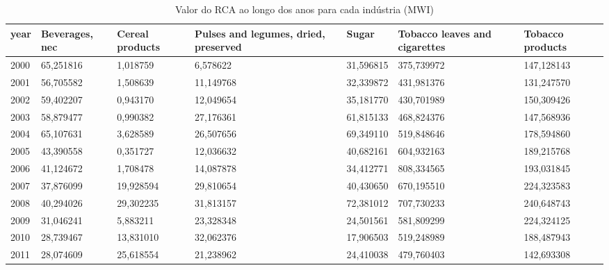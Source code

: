 \begin{table}
\centering
\caption{Valor do RCA ao longo dos anos para cada indústria (MWI)}
\begin{tabular}{p{1cm}p{2cm}p{2cm}p{2cm}p{2cm}p{2cm}p{2cm}}
\toprule
 year &  Beverages, nec &  Cereal products &  Pulses and legumes, dried, preserved &     Sugar &  Tobacco leaves and cigarettes &  Tobacco products \\
\midrule
 2000 &       65,251816 &         1,018759 &                              6,578622 & 31,596815 &                     375,739972 &        147,128143 \\
 2001 &       56,705582 &         1,508639 &                             11,149768 & 32,339872 &                     431,981376 &        131,247570 \\
 2002 &       59,402207 &         0,943170 &                             12,049654 & 35,181770 &                     430,701989 &        150,309426 \\
 2003 &       58,879477 &         0,990382 &                             27,176361 & 61,815133 &                     468,824376 &        147,568936 \\
 2004 &       65,107631 &         3,628589 &                             26,507656 & 69,349110 &                     519,848646 &        178,594860 \\
 2005 &       43,390558 &         0,351727 &                             12,036632 & 40,682161 &                     604,932163 &        189,215768 \\
 2006 &       41,124672 &         1,708478 &                             14,087878 & 34,412771 &                     808,334565 &        193,031845 \\
 2007 &       37,876099 &        19,928594 &                             29,810654 & 40,430650 &                     670,195510 &        224,323583 \\
 2008 &       40,294026 &        29,302235 &                             31,813157 & 72,381012 &                     707,730233 &        240,648743 \\
 2009 &       31,046241 &         5,883211 &                             23,328348 & 24,501561 &                     581,809299 &        224,324125 \\
 2010 &       28,739467 &        13,831010 &                             32,062376 & 17,906503 &                     519,248989 &        188,487943 \\
 2011 &       28,074609 &        25,618554 &                             21,238962 & 24,410038 &                     479,760403 &        142,693308 \\

\end{tabular}
\end{table}

